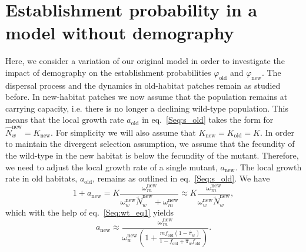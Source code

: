 \documentclass[11pt]{article}
\begin{document}
\newpage
\renewcommand{\theequation}{E\arabic{equation}}
\setcounter{equation}{0}  %

\section{Establishment probability in a model without demography}
Here, we consider a variation of our original model in order to investigate the impact of demography on the establishment probabilities $\varphi_{\text{old}}$ and $\varphi_{\text{new}}$. The dispersal process and the dynamics in old-habitat patches remain as studied before. In new-habitat patches we now assume that the population remains at carrying capacity, i.e. there is no longer a declining wild-type population. This means that the local growth rate $a_{\text{old}}$ in eq.~\eqref{Seq:s_old} takes the form for $\widehat{N}_w^{\text{new}}=K_{\text{new}}$. For simplicity we will also assume that $K_{\text{new}}=K_{\text{old}}=K$. In order to maintain the divergent selection assumption, we assume that the fecundity of the wild-type in the new habitat is below the fecundity of the mutant. %
Therefore, we need to adjust the local growth rate of a single mutant, $a_{\text{new}}$. The local growth rate in old habitats, $a_{\text{old}}$, remains as outlined in eq.~\eqref{Seq:s_old}. We have
\begin{equation}
1+a_{\text{new}} = K \frac{\omega_m^{\text{new}}}{\omega_w^{\text{new}} \widetilde{N}_w^{\text{new}}+ \omega_m^{\text{new}}}\approx K \frac{\omega_m^{\text{new}}}{\omega_w^{\text{new}} \widetilde{N}_w^{\text{new}}},
\end{equation}
which with the help of eq.~\eqref{Seq:wt_eq1} yields
\begin{equation}
a_{\text{new}} \approx \frac{\omega_m^{\text{new}}}{\omega_w^{\text{new}}\left(1+\frac{m f_{\text{old}} (1-\widehat{\pi}_w)}{1-f_{\text{old}}+\widehat{\pi}_w f_{\text{old}}}\right)}.
\end{equation}
\end{document}
